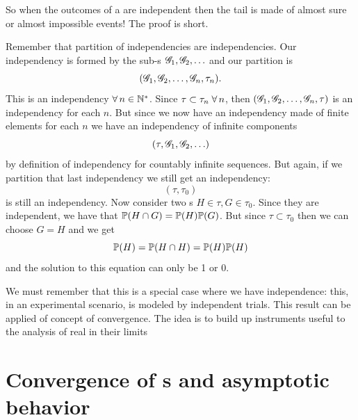 \documentclass{report}
\begin{document}
So when the outcomes of a \rv{} are independent then the tail is made of almost sure or almost impossible events! The proof is short.
\begin{fancyproof}
	Remember that partition of independencies are independencies. Our independency is formed by the sub-\sa s $\mathscr{G}_1,\mathscr{G}_2,\ldots$ and our partition is
	\[(\mathscr{G}_1,\mathscr{G}_2,\ldots,\mathscr{G}_n,\tau_n).\]
	This is an independency $\forall\, n\in\mathbb{N}^{*}$. Since $\tau\subset\tau_n\;\forall\, n$, then $(\mathscr{G}_1,\mathscr{G}_2,\ldots,\mathscr{G}_n,\tau)$ is an independency for each $n$. But since we now have an independency made of finite elements for each $n$ we have an independency of infinite components
	\[(\tau,\mathscr{G}_1,\mathscr{G}_2,\ldots)\]
	by definition of independency for countably infinite sequences. But again, if we partition that last independency we still get an independency:
	\[(\tau,\tau_0)\]
	is still an independency. Now consider two \sa s $H\in\tau,G\in\tau_0$. Since they are independent, we have that $\mathbb{P}(H\cap G)=\mathbb{P}(H)\mathbb{P}(G)$. But since $\tau\subset\tau_0$ then we can choose $G=H$ and we get
	\[\mathbb{P}(H)=\mathbb{P}(H\cap H)=\mathbb{P}(H)\mathbb{P}(H)\]
	and the solution to this equation can only be 1 or 0.
\end{fancyproof}
We must remember that this is a special case where we have independence: this, in an experimental scenario, is modeled by independent trials. This result can be applied of concept of convergence. The idea is to build up instruments useful to the analysis of real \rv{} in their limits
\section{Convergence of \rv s and asymptotic behavior}
\end{document}
